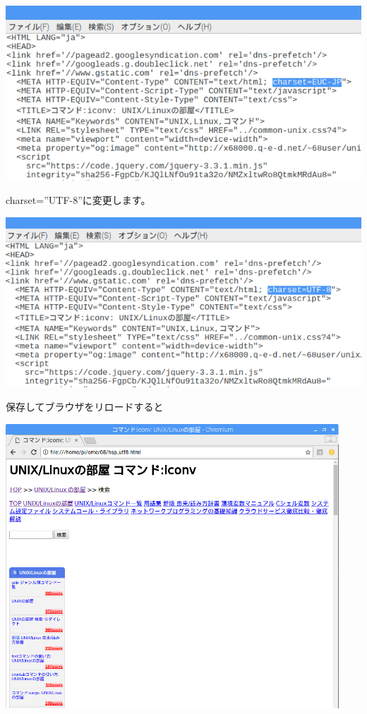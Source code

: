 \documentclass[a4paper,12pt,dvipdfmx]{jarticle}
\begin{document}
\begin{center}
\includegraphics[width=17.006cm]{textbook-img025.png}

\end{center}
charset=”UTF-8”に変更します。



\begin{center}
\includegraphics[width=17.006cm]{textbook-img026.png}

\end{center}
保存してブラウザをリロードすると



\begin{center}
\includegraphics[width=12.495cm]{textbook-img027.png}

\end{center}
\end{document}
